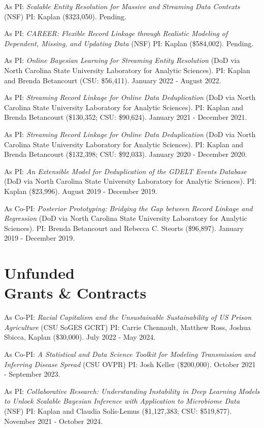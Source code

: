 \documentclass[margin,line]{res}
\begin{document}
\begin{resume}
As PI: {\em Scalable Entity Resolution for Massive and Streaming Data Contexts} (NSF) PI: Kaplan (\$323,050). Pending.

As PI: {\em CAREER: Flexible Record Linkage through Realistic Modeling of Dependent, Missing, and Updating Data} (NSF) PI: Kaplan (\$584,002). Pending. 

As PI: {\em Online Bayesian Learning for Streaming Entity Resolution} (DoD via North Carolina State University Laboratory for Analytic Sciences). PI: Kaplan and Brenda Betancourt (CSU: \$56,411). January 2022 - August 2022.

As PI: {\em Streaming Record Linkage for Online Data Deduplication} (DoD via North Carolina State University Laboratory for Analytic Sciences). PI: Kaplan and Brenda Betancourt (\$130,352; CSU: \$90,624). January 2021 - December 2021.

As PI: {\em Streaming Record Linkage for Online Data Deduplication} (DoD via North Carolina State University Laboratory for Analytic Sciences). PI: Kaplan and Brenda Betancourt (\$132,398; CSU: \$92,033). January 2020 - December 2020.

As PI: {\em An Extensible Model for Deduplication of the GDELT Events Database} (DoD via North Carolina State University Laboratory for Analytic Sciences). PI: Kaplan (\$23,996). August 2019 - December 2019.

As Co-PI: {\em Posterior Prototyping: Bridging the Gap between Record Linkage and Regression} (DoD via North Carolina State University Laboratory for Analytic Sciences). PI: Brenda Betancourt and Rebecca C. Steorts (\$96,897). January 2019 - December 2019.

\section{\sc Unfunded \\ Grants \& Contracts}
 
As Co-PI: {\em Racial Capitalism and the Unsustainable Sustainability of US Prison Agriculture } (CSU SoGES GCRT) PI: Carrie Chennault, Matthew Ross, Joshua Sbicca, Kaplan (\$30,000). July 2022 - May 2024.
 
As Co-PI: {\em A Statistical and Data Science Toolkit for Modeling Transmission and Inferring Disease Spread} (CSU OVPR) PI: Josh Keller (\$200,000). October 2021 - September 2023. 
 
As PI: {\em Collaborative Research: Understanding Instability in Deep Learning Models to Unlock Scalable Bayesian Inference with Application to Microbiome Data} (NSF) PI: Kaplan and Claudia Sol\'{i}s-Lemus (\$1,127,383; CSU: \$519,877). November 2021 - October 2024. 
 

\end{resume}
\end{document}
